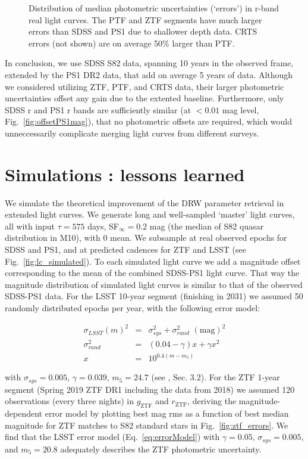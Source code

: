 \documentclass[twocolumn]{aastex62}
\begin{document}
\begin{figure}
	\caption{Distribution of median photometric uncertainties (`errors') in r-band real light curves. The PTF and ZTF segments have much larger errors than SDSS and PS1 due to shallower depth data. CRTS errors (not shown) are on average 50\% larger than PTF.}
	\label{fig:lc_errors}
\end{figure} 


In conclusion, we use SDSS S82 data, spanning 10 years in the observed frame, extended by the PS1 DR2 data, that add on average 5 years of data. Although we considered utilizing ZTF, PTF, and CRTS data, their larger photometric uncertainties offset any gain due to the extented baseline. Furthermore, only SDSS r and PS1 r bands are sufficiently similar (at $< 0.01$ mag level, Fig.~\ref{fig:offsetPS1mag}), that no photometric offsets are required, which would unneccessarily complicate merging light curves from different surveys.
%
%
%
%
%

\section{Simulations : lessons learned}\label{sec:simulation}

We simulate the theoretical improvement of the DRW parameter retrieval in extended light curves. We generate long and well-sampled  `master' light curves, all with input $\tau = 575 $ days, SF$_{\infty} = 0.2$ mag (the median of S82 quasar distribution in M10), with 0 mean.  We subsample at real observed epochs for SDSS and PS1, and at predicted cadences for ZTF and LSST  (see Fig.~\ref{fig:lc_simulated}). To each simulated light curve we add a magnitude offset corresponding to the mean of the combined SDSS-PS1 light curve. That way the magnitude distribution of simulated light curves is similar to that of the observed SDSS-PS1 data. For the LSST 10-year segment (finishing in 2031) we assumed 50 randomly distributed  epochs per year, with the following error model:

\begin{eqnarray}
\label{eq:errorModel}
\sigma_{LSST}(m)^{2} &=& \sigma_{sys}^{2} + \sigma_{rand}^{2} \,\, \mathrm{(mag)}^{2} \\
\sigma_{rand}^{2} &=& (0.04-\gamma)x + \gamma x^{2} \nonumber \\
x &=& 10^{0.4(m-m_{5})} \nonumber
\end{eqnarray}

with  $\sigma_{sys} = 0.005$, $\gamma=0.039$, $m_{5} = 24.7$ (see \citealt{ivezic2019}, Sec. 3.2).
For the ZTF 1-year segment (Spring 2019 ZTF DR1 including the data from 2018) we assumed 120 observations (every three nights) in $g_{\mathrm{ZTF}}$ and $r_{\mathrm{ZTF}}$, deriving the magnitude-dependent error model by plotting best mag rms as a function of best median magnitude for ZTF matches to S82 standard stars in Fig.~\ref{fig:ztf_errors}. We find that the LSST error model (Eq.~\ref{eq:errorModel}) with $\gamma = 0.05$, $\sigma_{sys} = 0.005 $, and $m_{5} = 20.8$ adequately describes the ZTF photometric uncertainty. 
\end{document}
